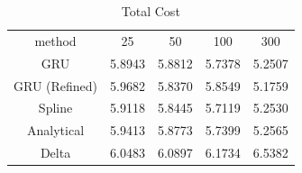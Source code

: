 \documentclass[letterpaper,12pt,titlepage,oneside,final]{book}
\numberwithin{equation}{section}
\theoremstyle{definition}
\begin{document}
\begin{table}[htp!]
\centering
\begin{tabular}{|c|c|c|c|c|}
  \hline
  method &25 &50&100&300 \\
  GRU          & 5.8943& 5.8812& 5.7378 & 5.2507 \\
  GRU (Refined)& 5.9682& 5.8370& 5.8549 & 5.1759 \\
  Spline    & 5.9118& 5.8445& 5.7119 & 5.2530 \\
  Analytical& 5.9413& 5.8773& 5.7399 & 5.2565 \\
  Delta     & 6.0483& 6.0897& 6.1734 & 6.5382 \\
  \hline
\end{tabular}
\caption{Total Cost}
\end{table}
\end{document}
